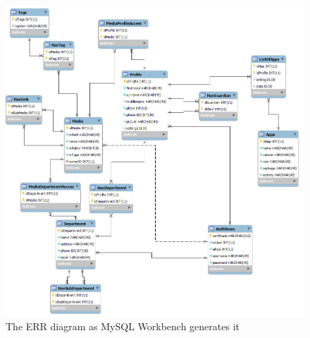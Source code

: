 \begin{figure}[ht]
	\centering
		\includegraphics[width=1.00\textwidth]{images/workbenchWrong.png}
	\caption{The ERR diagram as MySQL Workbench generates it}
	\label{fig:workbenchWrong}
\end{figure}
